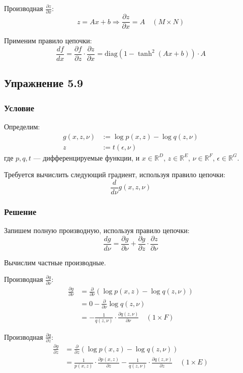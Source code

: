 \documentclass{article}
\begin{document}
Производная \( \frac{\partial z}{\partial x} \):
\[
z = Ax + b \Rightarrow \frac{\partial z}{\partial x} = A \quad (M \times N)
\]

Применим правило цепочки:
\[
\frac{df}{dx} = \frac{\partial f}{\partial z} \cdot \frac{\partial z}{\partial x} = \text{diag}\left(1 - \tanh^2(Ax + b)\right) \cdot A
\]

\subsection*{Упражнение 5.9}

\subsubsection*{Условие}

Определим:
\begin{align*}
g(x, z, \nu) &:= \log p(x, z) - \log q(z, \nu) \\
z &:= t(\epsilon, \nu)
\end{align*}
где \(p, q, t\) — дифференцируемые функции, и \(x \in \mathbb{R}^D\), \(z \in \mathbb{R}^E\), \(\nu \in \mathbb{R}^F\), \(\epsilon \in \mathbb{R}^G\).

\quad

Требуется вычислить следующий градиент, используя правило цепочки:
\[
\frac{d}{d\nu} g(x, z, \nu)
\]

\subsubsection*{Решение}

Запишем полную производную, используя правило цепочки:
\[
\frac{dg}{d\nu} = \frac{\partial g}{\partial \nu} + \frac{\partial g}{\partial z} \cdot \frac{\partial z}{\partial \nu}
\]

Вычислим частные производные.

\quad

Производная \(\frac{\partial g}{\partial \nu}\):
\begin{align*}
\frac{\partial g}{\partial \nu} &= \frac{\partial}{\partial \nu} (\log p(x, z) - \log q(z, \nu)) \\
&= 0 - \frac{\partial}{\partial \nu} \log q(z, \nu) \\
&= -\frac{1}{q(z, \nu)} \cdot \frac{\partial q(z, \nu)}{\partial \nu} \quad (1 \times F)
\end{align*}

Производная \(\frac{\partial g}{\partial z}\):
\begin{align*}
\frac{\partial g}{\partial z} &= \frac{\partial}{\partial z} (\log p(x, z) - \log q(z, \nu)) \\
&= \frac{1}{p(x, z)} \cdot \frac{\partial p(x, z)}{\partial z} - \frac{1}{q(z, \nu)} \cdot \frac{\partial q(z, \nu)}{\partial z} \quad (1 \times E)
\end{align*}
\end{document}
